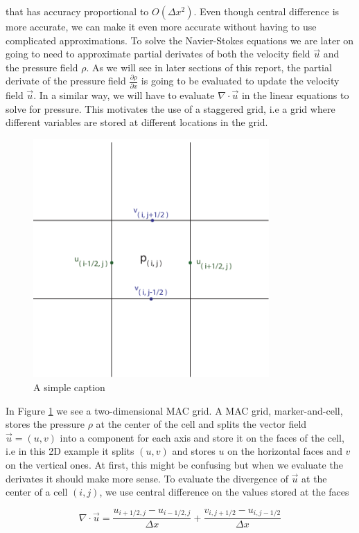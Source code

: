 that has accuracy proportional to $O(\Delta x^{2})$. Even though central difference is more accurate, we can make it even more accurate without having to use complicated approximations. To solve the Navier-Stokes equations we are later on going to need to approximate partial derivates of both the velocity field $\vec{u}$ and the pressure field $\rho$. As we will see in later sections of this report, the partial derivate of the pressure field $\frac{\partial \rho}{\partial x}$ is going to be evaluated to update the velocity field $\vec{u}$. In a similar way, we will have to evaluate $\nabla \cdot \vec{u}$ in the linear equations to solve for pressure. This motivates the use of a staggered grid, i.e a grid where different variables are stored at different locations in the grid.

\begin{figure}[ht!]
\centering
\includegraphics[width=90mm]{img/mac2.pdf}
\caption{A simple caption}
\label{macgrid}
\end{figure}

In Figure \ref{macgrid} we see a two-dimensional MAC grid. A MAC grid, marker-and-cell, stores the pressure $\rho$ at the center of the cell and splits the vector field $\vec{u} = (u,v)$ into a component for each axis and store it on the faces of the cell, i.e in this 2D example it splits $(u,v)$ and stores $u$ on the horizontal faces and $v$ on the vertical ones. At first, this might be confusing but when we evaluate the derivates it should make more sense. To evaluate the divergence of $\vec{u}$ at the center of a cell $(i,j)$, we use central difference on the values stored at the faces

\begin{equation}
\nabla \cdot \vec{u} = \frac{u_{i+1/2,j} - u_{i-1/2,j}}{\Delta x} + 
                       \frac{v_{i,j+1/2} - u_{i,j-1/2}}{\Delta x}
\end{equation}

